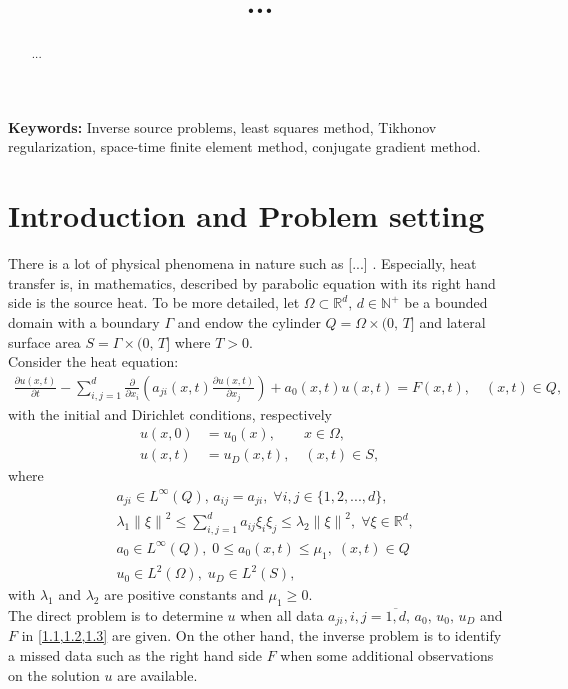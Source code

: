 \documentclass[]{article}
\title{...}
\begin{document}
\justifying
\maketitle
\begin{abstract}
...
\end{abstract}

\textbf{Keywords:} Inverse source problems, least squares method, Tikhonov regularization, space-time finite element method, conjugate gradient method.

\section{Introduction and Problem setting}
There is a lot of physical phenomena in nature such as [...] . Especially, heat transfer  is, in mathematics, described by parabolic equation with its right hand side is the source heat. To be more detailed, let $\Omega \subset \mathbb{R}^d,\, d\in \mathbb{N^+}$ be a bounded domain with a boundary $\Gamma$ and endow the cylinder $Q=\Omega\times (0,\, T]$ and lateral surface area $S=\Gamma \times (0,\, T]$ where $T>0$. 
\\
Consider the heat equation:
\begin{align}\label{1.1}
	\frac{\partial u(x, t)}{\partial t}-\sum_{i, j=1}^{d}\frac{\partial}{\partial x_i}\left(a_{ji}(x, t)\frac{\partial u(x, t)}{\partial x_j}\right)+a_0(x, t)u(x, t)=F(x, t), \quad(x, t)\in Q,
\end{align}
with the initial and Dirichlet conditions, respectively
\begin{align}
	u(x, 0)&=u_0(x),\quad\quad x\in \Omega,\label{1.2}\\
	u(x, t)&=u_D(x, t),\quad(x, t)\in S, \label{1.3}
\end{align}
where
\begin{align*}
	&a_{ji}\in L^{\infty}(Q),\, a_{ij}=a_{ji},\; \forall i, j\in \{1, 2, ..., d\},\\
	&\lambda_1\left\|\xi\right\|^2\leq \sum_{i, j=1}^{d}a_{ij}\xi_i\xi_j\leq \lambda_2\left\|\xi\right\|^2,\; \forall \xi\in\mathbb{R}^d,\\
	&a_0\in L^{\infty}(Q),\; 0\leq a_0(x, t)\leq \mu_1,\; (x, t)\in Q\\ 
	&u_0\in L^2(\Omega),\;u_D\in L^2(S),
\end{align*}
with $\lambda_1$ and $\lambda_2$ are positive constants and $\mu_1\geq 0$.
\\
The direct problem is to determine $u$ when all data $a_{ji}, i, j=\overline{1, d}, \, a_0,\,u_0,\,u_D$ and $F$ in \cref{1.1,1.2,1.3} are given. On the other hand, the inverse problem is to identify a missed data such as the right hand side $F$ when some additional observations on the solution $u$ are available. 
\end{document}
